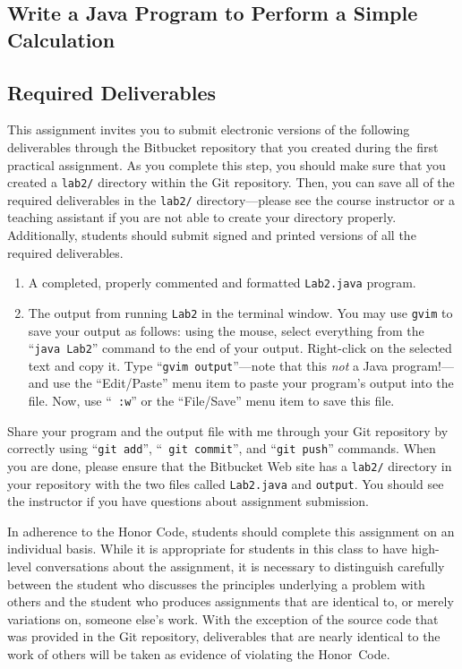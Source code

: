 \vspace*{-.1in}
\subsection*{Write a Java Program to Perform a Simple Calculation}

\subsection*{Required Deliverables}

This assignment invites you to submit electronic versions of the following deliverables through the Bitbucket repository
that you created during the first practical assignment.  As you complete this step, you should make sure that you
created a {\tt lab2/} directory within the Git repository.  Then, you can save all of the required deliverables in the
{\tt lab2/} directory---please see the course instructor or a teaching assistant if you are not able to create your
directory properly.  Additionally, students should submit signed and printed versions of all the required deliverables.

\begin{enumerate}

	\item A completed, properly commented and formatted {\tt Lab2.java} program.

        \item The output from running {\tt Lab2} in the terminal window. You may use {\tt gvim} to save your output as
          follows: using the mouse, select everything from the ``{\tt java Lab2}'' command to the end of your output.
          Right-click on the selected text and copy it.  Type ``{\tt gvim output}''---note that this {\em not} a Java
          program!---and use the ``Edit/Paste'' menu item to paste your program's output into the file.  Now, use ``{\tt
          :w}'' or the ``File/Save'' menu item to save this file.

\end{enumerate}

Share your program and the output file with me through your Git repository by correctly using ``{\tt git add}'', ``{\tt
git commit}'', and ``{\tt git push}'' commands. When you are done, please ensure that the Bitbucket Web site has
a {\tt lab2/} directory in your repository with the two files called {\tt Lab2.java} and {\tt output}. You should see 
the instructor if you have questions about assignment submission.

In adherence to the Honor Code, students should complete this assignment on an individual basis. While it is appropriate
for students in this class to have high-level conversations about the assignment, it is necessary to distinguish
carefully between the student who discusses the principles underlying a problem with others and the student who produces
assignments that are identical to, or merely variations on, someone else's work.  With the exception of the source code
that was provided in the Git repository, deliverables that are nearly identical to the work of others will be taken as
evidence of violating the \mbox{Honor Code}.  


